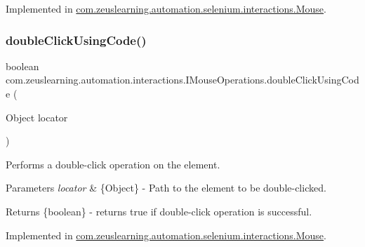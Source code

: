 Implemented in \hyperlink{classcom_1_1zeuslearning_1_1automation_1_1selenium_1_1interactions_1_1Mouse_a52db5f47eaacbf45fefed4f20be7fbf0}{com.\+zeuslearning.\+automation.\+selenium.\+interactions.\+Mouse}.

\hypertarget{interfacecom_1_1zeuslearning_1_1automation_1_1interactions_1_1IMouseOperations_a928202fe444c43e446a21baf312d40d9}{}\label{interfacecom_1_1zeuslearning_1_1automation_1_1interactions_1_1IMouseOperations_a928202fe444c43e446a21baf312d40d9} 
\subsubsection{\texorpdfstring{double\+Click\+Using\+Code()}{doubleClickUsingCode()}}
{\footnotesize\ttfamily boolean com.\+zeuslearning.\+automation.\+interactions.\+I\+Mouse\+Operations.\+double\+Click\+Using\+Code (\begin{DoxyParamCaption}\item[{Object}]{locator }\end{DoxyParamCaption})}

Performs a double-\/click operation on the element.


\begin{DoxyParams}{Parameters}
{\em locator} & \{Object\} -\/ Path to the element to be double-\/clicked.\\
\hline
\end{DoxyParams}
\begin{DoxyReturn}{Returns}
\{boolean\} -\/ returns {\ttfamily true} if double-\/click operation is successful. 
\end{DoxyReturn}


Implemented in \hyperlink{classcom_1_1zeuslearning_1_1automation_1_1selenium_1_1interactions_1_1Mouse_a4d718e201b6eb171a4016ea46e5f538b}{com.\+zeuslearning.\+automation.\+selenium.\+interactions.\+Mouse}.

\hypertarget{interfacecom_1_1zeuslearning_1_1automation_1_1interactions_1_1IMouseOperations_af96d9b23c841ba11f4ba19d8c54444ec}{}\label{interfacecom_1_1zeuslearning_1_1automation_1_1interactions_1_1IMouseOperations_af96d9b23c841ba11f4ba19d8c54444ec} 
